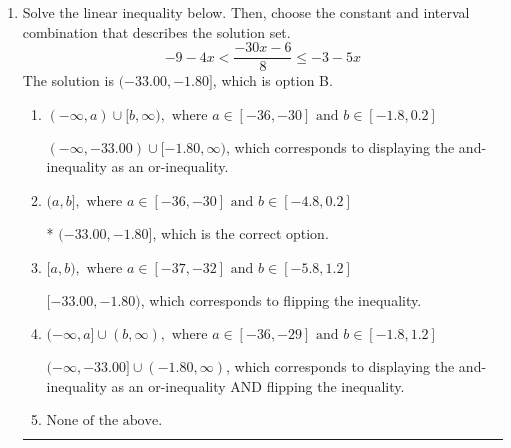 \documentclass{extbook}[14pt]
\newcommand{\litem}[1]{\item #1

\rule{\textwidth}{0.4pt}}
\begin{document}
\begin{enumerate}
{\begin{enumerate}[label=\Alph*.]
 $[-2.665, \infty)$, which corresponds to switching the direction of the interval. You likely did this if you did not flip the inequality when dividing by a negative!
\item \( [a, \infty), \text{ where } a \in [1.67, 7.67] \)

 $[2.665, \infty)$, which corresponds to switching the direction of the interval AND negating the endpoint. You likely did this if you did not flip the inequality when dividing by a negative as well as not moving values over to a side properly.
\item \( \text{None of the above}. \)

You may have chosen this if you thought the inequality did not match the ends of the intervals.
\end{enumerate}

\textbf{General Comment:} Remember that less/greater than or equal to includes the endpoint, while less/greater do not. Also, remember that you need to flip the inequality when you multiply or divide by a negative.
}
\litem{
Solve the linear inequality below. Then, choose the constant and interval combination that describes the solution set.
\[ -9 - 4 x < \frac{-30 x - 6}{8} \leq -3 - 5 x \]The solution is \( (-33.00, -1.80] \), which is option B.\begin{enumerate}[label=\Alph*.]
\item \( (-\infty, a) \cup [b, \infty), \text{ where } a \in [-36, -30] \text{ and } b \in [-1.8, 0.2] \)

$(-\infty, -33.00) \cup [-1.80, \infty)$, which corresponds to displaying the and-inequality as an or-inequality.
\item \( (a, b], \text{ where } a \in [-36, -30] \text{ and } b \in [-4.8, 0.2] \)

* $(-33.00, -1.80]$, which is the correct option.
\item \( [a, b), \text{ where } a \in [-37, -32] \text{ and } b \in [-5.8, 1.2] \)

$[-33.00, -1.80)$, which corresponds to flipping the inequality.
\item \( (-\infty, a] \cup (b, \infty), \text{ where } a \in [-36, -29] \text{ and } b \in [-1.8, 1.2] \)

$(-\infty, -33.00] \cup (-1.80, \infty)$, which corresponds to displaying the and-inequality as an or-inequality AND flipping the inequality.
\item \( \text{None of the above.} \)


\end{enumerate}

}
\end{enumerate}
\end{document}
